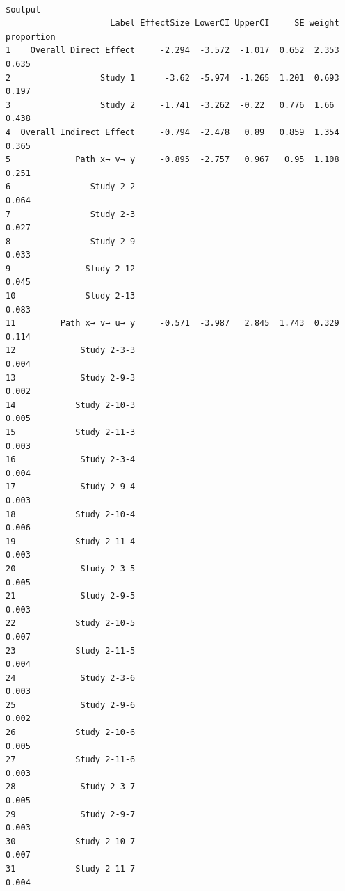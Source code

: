 \begin{verbatim}

$output
                     Label EffectSize LowerCI UpperCI     SE weight proportion
1    Overall Direct Effect     -2.294  -3.572  -1.017  0.652  2.353      0.635
2                  Study 1      -3.62  -5.974  -1.265  1.201  0.693      0.197
3                  Study 2     -1.741  -3.262  -0.22   0.776  1.66       0.438
4  Overall Indirect Effect     -0.794  -2.478   0.89   0.859  1.354      0.365
5             Path x→ v→ y     -0.895  -2.757   0.967   0.95  1.108      0.251
6                Study 2-2                                               0.064
7                Study 2-3                                               0.027
8                Study 2-9                                               0.033
9               Study 2-12                                               0.045
10              Study 2-13                                               0.083
11         Path x→ v→ u→ y     -0.571  -3.987   2.845  1.743  0.329      0.114
12             Study 2-3-3                                               0.004
13             Study 2-9-3                                               0.002
14            Study 2-10-3                                               0.005
15            Study 2-11-3                                               0.003
16             Study 2-3-4                                               0.004
17             Study 2-9-4                                               0.003
18            Study 2-10-4                                               0.006
19            Study 2-11-4                                               0.003
20             Study 2-3-5                                               0.005
21             Study 2-9-5                                               0.003
22            Study 2-10-5                                               0.007
23            Study 2-11-5                                               0.004
24             Study 2-3-6                                               0.003
25             Study 2-9-6                                               0.002
26            Study 2-10-6                                               0.005
27            Study 2-11-6                                               0.003
28             Study 2-3-7                                               0.005
29             Study 2-9-7                                               0.003
30            Study 2-10-7                                               0.007
31            Study 2-11-7                                               0.004

\end{verbatim}
